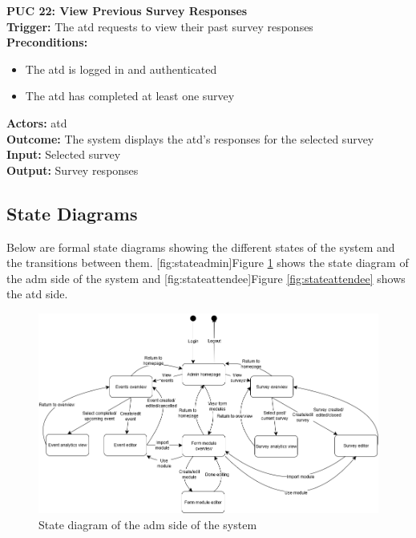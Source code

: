 \documentclass[12pt]{article}
\begin{document}
{\textbf{PUC 22: View Previous Survey Responses} \\
\textbf{Trigger:} The \gls{atd} requests to view their past survey responses \\
\textbf{Preconditions:}
\begin{itemize}
  \item The \gls{atd} is logged in and authenticated
  \item The \gls{atd} has completed at least one survey
\end{itemize}
\textbf{Actors:} \Gls{atd} \\
\textbf{Outcome:} The system displays the \gls{atd}’s responses for the selected survey \\
\textbf{Input:} Selected survey \\
\textbf{Output:} Survey responses \\
}

\subsection{State Diagrams}

Below are formal state diagrams showing the different states of the system and the transitions between them. [fig:stateadmin]{Figure \ref{fig:stateadmin}} shows the state diagram of the \gls{adm} side of the system and [fig:stateattendee]{Figure \ref{fig:stateattendee}} shows the \gls{atd} side.

\begin{center}
\begin{figure}[H]
    \centering
    \includegraphics[width=1\linewidth]{images/state_diagram_admin.png}
    \caption{State diagram of the \gls{adm} side of the system}\label{fig:stateadmin}
\end{figure}
\end{center}
\end{document}
